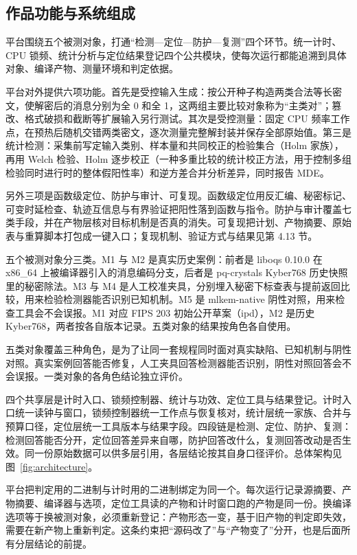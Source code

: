 \subsection{作品功能与系统组成}

平台围绕五个被测对象，打通“检测—定位—防护—复测”四个环节。统一计时、CPU 锁频、统计分析与定位结果登记四个公共模块，使每次运行都能追溯到具体对象、编译产物、测量环境和判定依据。

平台对外提供六项功能。首先是受控输入生成：按公开种子构造两类合法等长密文，使解密后的消息分别为全 0 和全 1，这两组主要比较对象称为“主类对”；篡改、格式破损和截断等扩展输入另行测试。其次是受控测量：固定 CPU 频率工作点，在预热后随机交错两类密文，逐次测量完整解封装并保存全部原始值。第三是统计检测：采集前写定输入类别、样本量和共同校正的检验集合（Holm 家族），再用 Welch 检验、Holm 逐步校正（一种多重比较的统计校正方法，用于控制多组检验同时进行时的整体假阳性率）和逆方差合并分析差异，同时报告 MDE。

另外三项是函数级定位、防护与审计、可复现。函数级定位用反汇编、秘密标记、可变时延检查、轨迹互信息与有界验证把阳性落到函数与指令。防护与审计覆盖七类手段，并在产物层核对目标机制是否真的消失。可复现把计划、产物摘要、原始表与重算脚本打包成一键入口；复现机制、验证方式与结果见第 4.13 节。

五个被测对象分三类。M1 与 M2 是真实历史案例：前者是 liboqs 0.10.0 在 x86\_64 上被编译器引入的消息编码分支，后者是 pq-crystals Kyber768 历史快照里的秘密除法。M3 与 M4 是人工校准夹具，分别埋入秘密下标查表与提前返回比较，用来检验检测器能否识别已知机制。M5 是 mlkem-native 阴性对照，用来检查工具会不会误报。M1 对应 FIPS 203 初始公开草案（ipd），M2 是历史 Kyber768，两者按各自版本记录。五类对象的结果按角色各自使用。

五类对象覆盖三种角色，是为了让同一套规程同时面对真实缺陷、已知机制与阴性对照。真实案例回答能否修复，人工夹具回答检测器能否识别，阴性对照回答会不会误报。一类对象的各角色结论独立评价。

四个共享层是计时入口、锁频控制器、统计与功效、定位工具与结果登记。计时入口统一读钟与窗口，锁频控制器统一工作点与恢复核对，统计层统一家族、合并与预算口径，定位层统一工具版本与结果字段。四段链是检测、定位、防护、复测：检测回答能否分开，定位回答差异来自哪，防护回答改什么，复测回答改动是否生效。同一份原始数据可以供多层引用，各层结论按其自身口径评价。总体架构见图~\ref{fig:architecture}。

平台把判定用的二进制与计时用的二进制绑定为同一个。每次运行记录源摘要、产物摘要、编译器与选项，定位工具读的产物和计时窗口跑的产物是同一份。换编译选项等于换被测对象，必须重新登记：产物形态一变，基于旧产物的判定即失效，需要在新产物上重新判定。这条约束把“源码改了”与“产物变了”分开，也是后面所有分层结论的前提。

